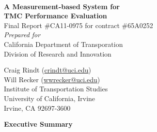 \documentclass[12pt]{report}
\renewcommand{\headrulewidth}{0.4pt}
\renewcommand{\footrulewidth}{0pt}
\begin{document}
\begin{titlepage}
  
  \begin{center}
    ~\\[1.75in]
    {\Huge \textbf{A Measurement-based System for \\[0.25em]TMC Performance Evaluation}}\\[0.5in]

    Final Report \#CA11-0975 for contract \#65A0252\\[0.25em]
    {\small \emph{Prepared for}}\\[0.25em]
    California Department of Transporation\\
    Division of Research and Innovation
    
    
    \vfill
    
  \end{center}
  \newlength{\authorblockwidth}
  \settowidth{\authorblockwidth}{Institute of Transportation Studies}
  {\hfill
  \parbox{\authorblockwidth}{
    Craig Rindt (\url{crindt@uci.edu})\\
    Will Recker (\url{wwrecker@uci.edu})\\
    Institute of Transportation Studies\\
    University of California, Irvine\\
    Irvine, CA 92697-3600
    }
  }

\end{titlepage}






\fancypagestyle{plain}{%
  \fancyhf{} %
  \fancyfoot[C]{\thepage} %
  \renewcommand{\headrulewidth}{0pt}
  \renewcommand{\footrulewidth}{0pt}
}


\setcounter{page}{3}




\clearpage

\pagestyle{fancyplain}

{\noindent\huge\bfseries\centering Executive Summary\par\nobreak
  \vskip 20pt}
\label{execsum}

\end{document}
